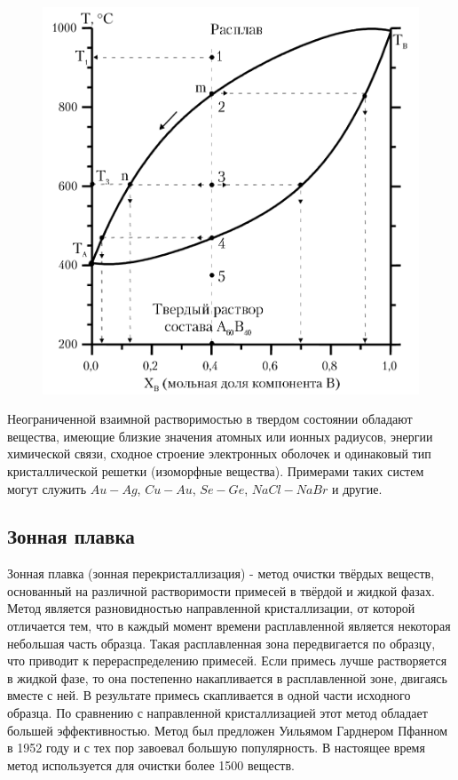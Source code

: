 \documentclass[14pt,a4paper]{scrartcl}
\begin{document}
\begin{figure}[htp]
\centering
\includegraphics[scale=.500]{cristallization-diagram2.png}
\caption{}
\label{}
\end{figure}

Неограниченной взаимной растворимостью в твердом состоянии обладают вещества, имеющие близкие значения атомных или ионных радиусов, энергии химической связи, сходное строение электронных оболочек и одинаковый тип кристаллической решетки (изоморфные вещества). Примерами таких систем могут служить $Au-Ag$, $Cu-Au$, $Se-Ge$, $NaCl-NaBr$ и другие.

\subsection*{Зонная плавка}

Зонная плавка (зонная перекристаллизация) - метод очистки твёрдых веществ, основанный на различной растворимости примесей в твёрдой и жидкой фазах. Метод является разновидностью направленной кристаллизации, от которой отличается тем, что в каждый момент времени расплавленной является некоторая небольшая часть образца. Такая расплавленная зона передвигается по образцу, что приводит к перераспределению примесей. Если примесь лучше растворяется в жидкой фазе, то она постепенно накапливается в расплавленной зоне, двигаясь вместе с ней. В результате примесь скапливается в одной части исходного образца. По сравнению с направленной кристаллизацией этот метод обладает большей эффективностью. Метод был предложен Уильямом Гарднером Пфанном в 1952 году и с тех пор завоевал большую популярность. В настоящее время метод используется для очистки более 1500 веществ.
\end{document}
